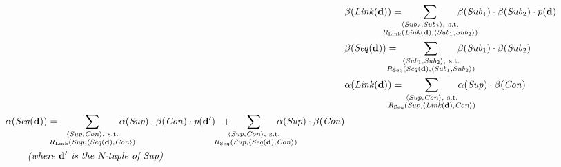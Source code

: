 \documentclass[english]{jnlp_1.4}
\begin{document}
\begin{align}
 & \beta (\mathit{Link} ({\bf{d}})) = \hspace{-8mm}
  \sum_{\substack{\langle \mathit{Sub_1}, \mathit{Sub}_2 \rangle,\ \mathrm{s.t.}\\
  R_{\mathrm{Link}} (\mathit{Link} ({\bf{d}}), \langle \mathit{Sub}_1, \mathit{Sub}_2 \rangle)}} \hspace{-8mm}
  \beta (\mathit{Sub}_1) \cdot \beta (\mathit{Sub}_2) \cdot p({\bf{d}})
  \label{blink}\\
 & \beta (\mathit{Seq} ({\bf{d}})) = \hspace{-4.5mm}
  \sum_{\substack{\langle \mathit{Sub}_1, \mathit{Sub}_2 \rangle,\ \mathrm{s.t.}\\
  R_{\mathrm{Seq}} (\mathit{Seq} ({\bf{d}}), \langle \mathit{Sub}_1, \mathit{Sub}_2 \rangle)}} \hspace{-7mm}
  \beta (\mathit{Sub}_1) \cdot \beta (\mathit{Sub}_2)
  \label{bseq}\\
 & \alpha (\mathit{Link} ({\bf{d}})) = \hspace{-6mm}
  \sum_{\substack{\langle \mathit{Sup}, \mathit{Con} \rangle,\ \mathrm{s.t.}\\
  R_{\mathrm{Seq}} (\mathit{Sup}, \langle \mathit{Link} ({\bf{d}}), \mathit{Con} \rangle)}} \hspace{-7mm}
  \alpha (\mathit{Sup}) \cdot \beta (\mathit{Con})
  \label{alink}\\
\begin{split}
 & \alpha (\mathit{Seq} ({\bf{d}})) = \hspace{-4mm}
  \sum_{\substack{\langle \mathit{Sup}, \mathit{Con} \rangle,\ \mathrm{s.t.}\\
  R_{\mathrm{Link}} (\mathit{Sup}, \langle \mathit{Seq} ({\bf{d}}), \mathit{Con} \rangle)}} \hspace{-6.5mm}
  \alpha (\mathit{Sup}) \cdot \beta (\mathit{Con}) \cdot p({\bf{d'}})
  \hspace{2mm} + \hspace{-8mm} \sum_{\substack{\langle \mathit{Sup}, \mathit{Con} \rangle,\ \mathrm{s.t.}\\
  \ R_{\mathrm{Seq}} (\mathit{Sup}, \langle \mathit{Seq} ({\bf{d}}), \mathit{Con} \rangle)}} \hspace{-8mm}
  \alpha (\mathit{Sup}) \cdot \beta (\mathit{Con}) \\
& \hspace{8mm}\text{\it (where ${\bf{d'}}$ is the N-tuple of $\mathit{Sup}$)}
  \label{aseq}
\end{split}
\end{align}
\end{document}
